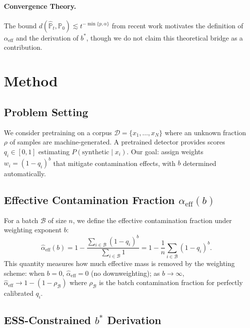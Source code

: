 \documentclass[11pt]{article}
\begin{document}
\paragraph{Convergence Theory.}
The bound $d(\hat{\mathbb{P}}_t, \mathbb{P}_0) \lesssim t^{-\min\{p, \alpha\}}$ from recent work motivates the definition of $\alpha_{\mathrm{eff}}$ and the derivation of $b^*$, though we do not claim this theoretical bridge as a contribution.

\section{Method}
\label{sec:method}

\subsection{Problem Setting}

We consider pretraining on a corpus $\mathcal{D} = \{x_1, \ldots, x_N\}$ where an unknown fraction $\rho$ of samples are machine-generated.
A pretrained detector provides scores $q_i \in [0,1]$ estimating $P(\text{synthetic} \mid x_i)$.
Our goal: assign weights $w_i = (1 - q_i)^b$ that mitigate contamination effects, with $b$ determined automatically.

\subsection{Effective Contamination Fraction $\hat{\alpha}_{\mathrm{eff}}(b)$}

For a batch $\mathcal{B}$ of size $n$, we define the effective contamination fraction under weighting exponent $b$:
\begin{equation}
    \hat{\alpha}_{\mathrm{eff}}(b) = 1 - \frac{\sum_{i \in \mathcal{B}} (1 - q_i)^b}{\sum_{i \in \mathcal{B}} 1} = 1 - \frac{1}{n} \sum_{i \in \mathcal{B}} (1 - q_i)^b.
\end{equation}
This quantity measures how much effective mass is removed by the weighting scheme: when $b = 0$, $\hat{\alpha}_{\mathrm{eff}} = 0$ (no downweighting); as $b \to \infty$, $\hat{\alpha}_{\mathrm{eff}} \to 1 - (1-\rho_{\mathcal{B}})$ where $\rho_{\mathcal{B}}$ is the batch contamination fraction for perfectly calibrated $q_i$.

\subsection{ESS-Constrained $b^*$ Derivation}
\end{document}
